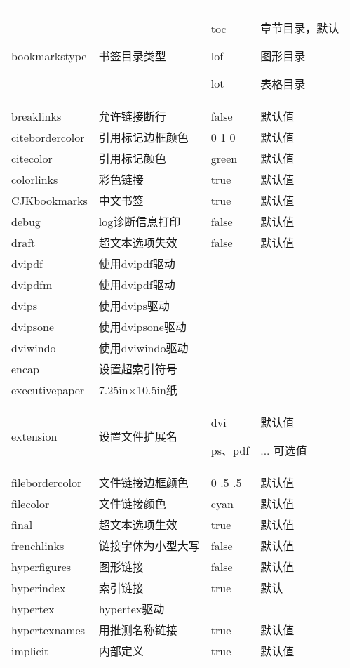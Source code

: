 \begin{center}
\begin{longtable}[H]{p{3.2cm}p{3cm}p{3cm}p{3cm}}
bookmarkstype
&
书签目录类型
&
toc\par
lof\par
lot
&
章节目录，默认\par
图形目录 \par
表格目录
\\
breaklinks  &允许链接断行 &false& 默认值\\
citebordercolor &引用标记边框颜色&{0 1 0}& 默认值\\
citecolor &引用标记颜色&green& 默认值\\
colorlinks &彩色链接&true &默认值\\
CJKbookmarks &中文书签&true &默认值\\
debug & log诊断信息打印&false& 默认值\\
draft & 超文本选项失效&false& 默认值\\
dvipdf &使用dvipdf驱动&&\\
dvipdfm &使用dvipdf驱动&&\\
dvips &使用dvips驱动&&\\
dvipsone &使用dvipsone驱动&&\\
dviwindo &使用dviwindo驱动&&\\
encap &设置超索引符号&&\\
executivepaper &7.25in×10.5in纸&&\\
extension &设置文件扩展名
&
dvi\par
ps、pdf
&
默认值\par
... 可选值
\\
filebordercolor &文件链接边框颜色&{0 .5 .5}& 默认值\\
filecolor &文件链接颜色&cyan &默认值\\
final& 超文本选项生效&true &默认值\\
frenchlinks &链接字体为小型大写&false& 默认值\\
hyperfigures &图形链接&false &默认值\\
hyperindex &索引链接&true &默认\\
hypertex &hypertex驱动&&\\
hypertexnames &用推测名称链接&true &默认值\\
implicit &内部定义&true &默认值\\


\end{longtable}
\end{center}
